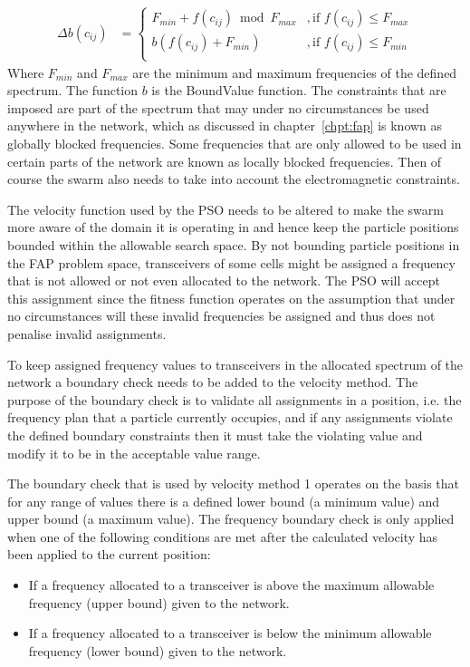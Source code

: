 \begin{align}
\label{eq:boundEq}
    \Delta b(c_{ij}) &= 
    \begin{cases}
    F_{min} + f(c_{ij}) \bmod F_{max} &, \text{if $f(c_{ij}) \leq F_{max}$}\\ 
    b(f(c_{ij}) + F_{min}) &, \text{if $f(c_{ij}) \leq F_{min}$}\\ 
    \end{cases}
\end{align}
Where $F_{min}$ and $F_{max}$ are the minimum and maximum frequencies of the defined spectrum. The function $b$ is the BoundValue function. The constraints that are imposed are part of the spectrum that may under no circumstances be used anywhere in the network, which as discussed in chapter~\ref{chpt:fap} is known as globally blocked frequencies. Some frequencies that are only allowed to be used in certain parts of the network are known as locally blocked frequencies. Then of course the swarm also needs to take into account the electromagnetic constraints.

The velocity function used by the \gls{PSO} needs to be altered to make the swarm more aware of the domain it is operating in and hence keep the particle positions bounded within the allowable search space. By not bounding particle positions in the \gls{FAP} problem space, transceivers of some cells might be assigned a frequency that is not allowed or not even allocated to the network. The \gls{PSO} will accept this assignment since the fitness function operates on the assumption that under no circumstances will these invalid frequencies be assigned and thus does not penalise invalid assignments.

To keep assigned frequency values to transceivers in the allocated spectrum of the network a boundary check needs to be added to the velocity method. The purpose of the boundary check is to validate all assignments in a position, i.e. the frequency plan that a particle currently occupies, and if any assignments violate the defined boundary constraints then it must take the violating value and modify it to be in the acceptable value range.

The boundary check that is used by velocity method 1 operates on the basis that for any range of values there is a defined lower bound (a minimum value) and upper bound (a maximum value). The frequency boundary check is only applied when one of the following conditions are met after the calculated velocity has been applied to the current position:
\begin{itemize}
\item If a frequency allocated to a transceiver is above the maximum allowable frequency (upper bound) given to the network. 
\item If a frequency allocated to a transceiver is below the minimum allowable frequency (lower bound) given to the network.
\end{itemize}

